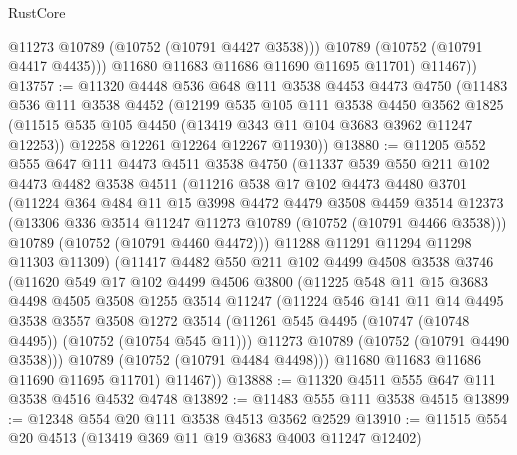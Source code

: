 \begin{lexlean}{RustCore}
\begin{coremodule}
              @11273
              @10789
              (@10752 (@10791 @4427 @3538)))
            @10789
            (@10752 (@10791 @4417 @4435)))
          @11680
          @11683
          @11686
          @11690
          @11695
          @11701)
        @11467))
@13757 := @11320
    @4448
    @536
    @648
    @111
    @3538
    @4453
    @4473
    @4750
    (@11483
      @536
      @111
      @3538
      @4452
      (@12199
        @535
        @105
        @111
        @3538
        @4450
        @3562
        @1825
        (@11515 @535 @105 @4450 (@13419 @343 @11 @104 @3683 @3962 @11247 @12253))
        @12258
        @12261
        @12264
        @12267
        @11930))
@13880 := @11205
    @552
    @555
    @647
    @111
    @4473
    @4511
    @3538
    @4750
    (@11337
      @539
      @550
      @211
      @102
      @4473
      @4482
      @3538
      @4511
      (@11216
        @538
        @17
        @102
        @4473
        @4480
        @3701
        (@11224
          @364
          @484
          @11
          @15
          @3998
          @4472
          @4479
          @3508
          @4459
          @3514
          @12373
          (@13306 @336 @3514 @11247 @11273 @10789 (@10752 (@10791 @4466 @3538)))
          @10789
          (@10752 (@10791 @4460 @4472)))
        @11288
        @11291
        @11294
        @11298
        @11303
        @11309)
      (@11417
        @4482
        @550
        @211
        @102
        @4499
        @4508
        @3538
        @3746
        (@11620
          @549
          @17
          @102
          @4499
          @4506
          @3800
          (@11225
            @548
            @11
            @15
            @3683
            @4498
            @4505
            @3508
            @1255
            @3514
            @11247
            (@11224
              @546
              @141
              @11
              @14
              @4495
              @3538
              @3557
              @3508
              @1272
              @3514
              (@11261 @545 @4495 (@10747 (@10748 @4495)) (@10752 (@10754 @545 @11)))
              @11273
              @10789
              (@10752 (@10791 @4490 @3538)))
            @10789
            (@10752 (@10791 @4484 @4498)))
          @11680
          @11683
          @11686
          @11690
          @11695
          @11701)
        @11467))
@13888 := @11320 @4511 @555 @647 @111 @3538 @4516 @4532 @4748
@13892 := @11483 @555 @111 @3538 @4515
@13899 := @12348 @554 @20 @111 @3538 @4513 @3562 @2529
@13910 := @11515 @554 @20 @4513 (@13419 @369 @11 @19 @3683 @4003 @11247 @12402)

\end{coremodule}
\end{lexlean}

